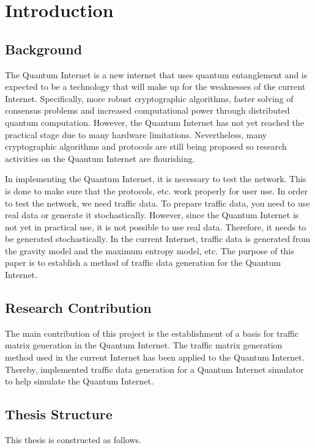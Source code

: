 \chapter{Introduction}
\label{introduction}

\section{Background}
\label{introduction:background}
The Quantum Internet is a new internet that uses quantum entanglement and is expected to be a technology that will make up for the weaknesses of the current Internet.
Specifically, more robust cryptographic algorithms, faster solving of consensus problems and increased computational power through distributed quantum computation. 
However, the Quantum Internet has not yet reached the practical stage due to many hardware limitations. 
Nevertheless, many cryptographic algorithms and protocols are still being proposed so research activities on the Quantum Internet are flourishing.

In implementing the Quantum Internet, it is necessary to test the network. 
This is done to make sure that the protocols, etc. work properly for user use. 
In order to test the network, we need traffic data. 
To prepare traffic data, you need to use real data or generate it stochastically.
However, since the Quantum Internet is not yet in practical use, it is not possible to use real data.
Therefore, it needs to be generated stochastically.
In the current Internet, traffic data is generated from the gravity model and the maximum entropy model, etc.
The purpose of this paper is to establish a method of traffic data generation for the Quantum Internet.

\section{Research Contribution}
\label{introduction:research_contribution}
The main contribution of this project is the establishment of a basis for traffic matrix generation in the Quantum Internet.
The traffic matrix generation method used in the current Internet has been applied to the Quantum Internet.
Thereby, implemented traffic data generation for a Quantum Internet simulator to help simulate the Quantum Internet.

\section{Thesis Structure}
\label{introduction:thesis_structure}
This thesis is constructed as follows.

